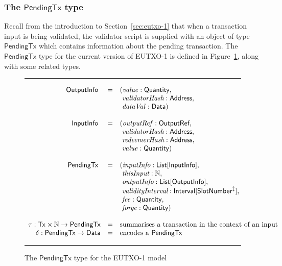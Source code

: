 \documentclass[a4paper]{article}
\renewcommand{\i}{\textit}  %
\newcommand{\s}{\textsf}  %
\newcommand{\msf}[1]{\ensuremath{\mathsf{#1}}}
\newcommand{\mi}[1]{\ensuremath{\mathit{#1}}}
\newcommand\rfskip{7pt}
\newenvironment{ruledfigure}[1]{\begin{figure}[#1]\hrule\vspace{\rfskip}}{\vspace{\rfskip}\hrule\end{figure}}
\newcommand{\List}[1]{\ensuremath{\s{List}[#1]}}
\newcommand{\Interval}[1]{\ensuremath{\s{Interval}[#1]}}
\newcommand{\extended}[1]{#1^\updownarrow}
\newcommand{\ptx}{\ensuremath{\s{PendingTx}}}
\newcommand{\Address}{\ensuremath{\s{Address}}}
\newcommand{\forge}{\mi{forge}}
\newcommand{\fee}{\mi{fee}}
\newcommand{\val}{\mi{value}}  %
\newcommand{\dataval}{\mi{dataVal}}
\newcommand{\Data}{\ensuremath{\s{Data}}}
\newcommand{\outputref}{\mi{outputRef}}
\newcommand{\slotnum}{\ensuremath{\s{SlotNumber}}}
\newcommand{\eutxotx}{\msf{Tx}}
\newcommand{\qty}{\ensuremath{\s{Quantity}}}
\newcommand\N{\ensuremath{\mathbb{N}}}
\begin{document}
\subsubsection{The \ptx{} type}
\label{sec:pendingtx}
Recall from the introduction to Section~\ref{sec:eutxo-1} that when a
transaction input is being validated, the validator script is supplied
with an object of type \ptx{} which contains information about the
pending transaction.  The \ptx{} type for the current version of
EUTXO-1 is defined in Figure~\ref{fig:ptx-1-types}, along with some
related types.

\begin{ruledfigure}{H}
  \begin{displaymath}
  \begin{array}{rll}
    \s{OutputInfo } &=&(\val: \qty,\\
                    & &\ \i{validatorHash}: \Address,\\
                    & &\ \dataval: \Data)\\
    \\
    \s{InputInfo } &=&(\outputref: \s{OutputRef},\\
                   & &\ \i{validatorHash}: \s{Address},\\
                   & &\ \i{redeemerHash}: \s{Address},\\
                   & &\ \val: \qty)\\
     \\
     \ptx\s{ } &=&(\i{inputInfo}: \List{\s{InputInfo}},\\
               & &\ \i{thisInput}: \N,\\
               & &\ \i{outputInfo}: \List{\s{OutputInfo}},\\
               & &\ \i{validityInterval}: \Interval{\extended{\slotnum}},\\
               & &\ \fee: \qty,\\
               & &\ \forge: \qty)\\
     \\
     \tau: \eutxotx \times \N \rightarrow \ptx &=& \mbox{summarises a transaction in the context of an input}\\
     \delta: \ptx \rightarrow \Data &=& \mbox{encodes a \ptx{}}
  \end{array}
  \end{displaymath}
  \caption{The \ptx{} type for the EUTXO-1 model}
  \label{fig:ptx-1-types}
\end{ruledfigure}
\end{document}
